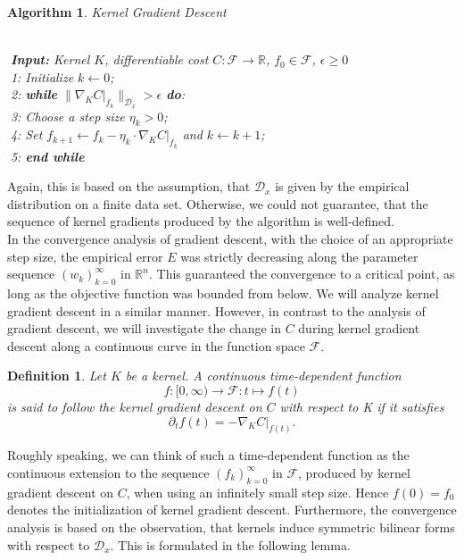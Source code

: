 \documentclass[11pt, a4paper]{article}
\newtheorem{definition}[theorem]{Definition}
\newtheorem{algorithm}[theorem]{Algorithm}
\newcommand{\R}{\mathbb{R}}
\newcommand{\D}{\mathcal{D}}
\newcommand{\F}{\mathcal{F}}
\begin{document}
\begin{algorithm}
\caption{Kernel Gradient Descent \textcolor{white}{$\Big |$}} \ \\
\textcolor{white}{$\Big |$}\textbf{Input:} Kernel $K$, differentiable cost $C: \F \to \R$, $f_0 \in \F$, $\epsilon \geq 0$ \\
\textcolor{white}{$\Big |$}1: Initialize $k \leftarrow 0$; \\
\textcolor{white}{$\Big |$}2: \textbf{while} $\big \| \nabla_K C |_{f_k} \big \|_{\D_x} > \epsilon$ \textbf{do}: \\
\textcolor{white}{$\Big |$}3: \quad Choose a step size $\eta_k > 0$; \\
\textcolor{white}{$\Big |$}4: \quad Set $f_{k+1} \leftarrow f_k - \eta_k \cdot \nabla_ K C |_{f_k}$ and $k \leftarrow k+1$; \\
\textcolor{white}{$\Big |$}5: \textbf{end while}
\end {algorithm}

Again, this is based on the assumption, that  $\D_x$ is given by the empirical distribution on a finite data set. Otherwise, we could not guarantee, that the sequence of kernel gradients produced by the algorithm is well-defined. \\

In the convergence analysis of gradient descent, with the choice of an appropriate step size, the empirical error $E$ was strictly decreasing along the parameter sequence $(w_k)_{k=0}^\infty$ in $\R^n$. This guaranteed the convergence to a critical point, as long as the objective function was bounded from below. We will analyze kernel gradient descent in a similar manner. However, in contrast to the analysis of gradient descent, we will investigate the change in $C$ during kernel gradient descent along a continuous curve in the function space $\F$. 

\begin{definition}
Let $K$ be a kernel. A continuous time-dependent function 
\[ f : [0, \infty) \to \F : t \mapsto f(t) \]
is said to follow the kernel gradient descent on $C$ with respect to K if it satisfies
\[ \partial_tf(t) = - \nabla_KC|_{f(t)}. \]
\end{definition}

Roughly speaking, we can think of such a time-dependent function as the continuous extension to the sequence $(f_k)_{k=0}^\infty$ in $\F$, produced by kernel gradient descent on $C$, when using an infinitely small step size. Hence $f(0) = f_0$ denotes the initialization of kernel gradient descent. Furthermore, the convergence analysis is based on the observation, that kernels induce symmetric bilinear forms with respect to $\D_x$. This is formulated in the following lemma.
\end{document}
